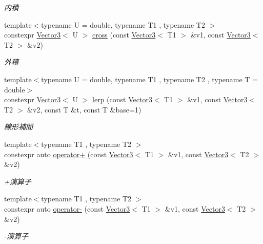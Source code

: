 \begin{DoxyCompactItemize}
\begin{DoxyCompactList}\small\item\em 内積 \end{DoxyCompactList}\item 
{\footnotesize template$<$typename U  = double, typename T1 , typename T2 $>$ }\\constexpr \mbox{\hyperlink{classsaki_1_1_vector3}{Vector3}}$<$ U $>$ \mbox{\hyperlink{namespacesaki_a0292208be2262a7ecbba114ebd10d5d6}{cross}} (const \mbox{\hyperlink{classsaki_1_1_vector3}{Vector3}}$<$ T1 $>$ \&v1, const \mbox{\hyperlink{classsaki_1_1_vector3}{Vector3}}$<$ T2 $>$ \&v2)
\begin{DoxyCompactList}\small\item\em 外積 \end{DoxyCompactList}\item 
{\footnotesize template$<$typename U  = double, typename T1 , typename T2 , typename T  = double$>$ }\\constexpr \mbox{\hyperlink{classsaki_1_1_vector3}{Vector3}}$<$ U $>$ \mbox{\hyperlink{namespacesaki_a3530d2e9468376228a3836112bd423c1}{lerp}} (const \mbox{\hyperlink{classsaki_1_1_vector3}{Vector3}}$<$ T1 $>$ \&v1, const \mbox{\hyperlink{classsaki_1_1_vector3}{Vector3}}$<$ T2 $>$ \&v2, const T \&t, const T \&base=1)
\begin{DoxyCompactList}\small\item\em 線形補間 \end{DoxyCompactList}\item 
{\footnotesize template$<$typename T1 , typename T2 $>$ }\\constexpr auto \mbox{\hyperlink{namespacesaki_a482be906f8ccfd7fa303391e28e44f05}{operator+}} (const \mbox{\hyperlink{classsaki_1_1_vector3}{Vector3}}$<$ T1 $>$ \&v1, const \mbox{\hyperlink{classsaki_1_1_vector3}{Vector3}}$<$ T2 $>$ \&v2)
\begin{DoxyCompactList}\small\item\em +演算子 \end{DoxyCompactList}\item 
{\footnotesize template$<$typename T1 , typename T2 $>$ }\\constexpr auto \mbox{\hyperlink{namespacesaki_ab4e324d1879fdeb0737196f18a3b42e2}{operator-\/}} (const \mbox{\hyperlink{classsaki_1_1_vector3}{Vector3}}$<$ T1 $>$ \&v1, const \mbox{\hyperlink{classsaki_1_1_vector3}{Vector3}}$<$ T2 $>$ \&v2)
\begin{DoxyCompactList}\small\item\em -\/演算子 \end{DoxyCompactList}\item 

\end{DoxyCompactItemize}
